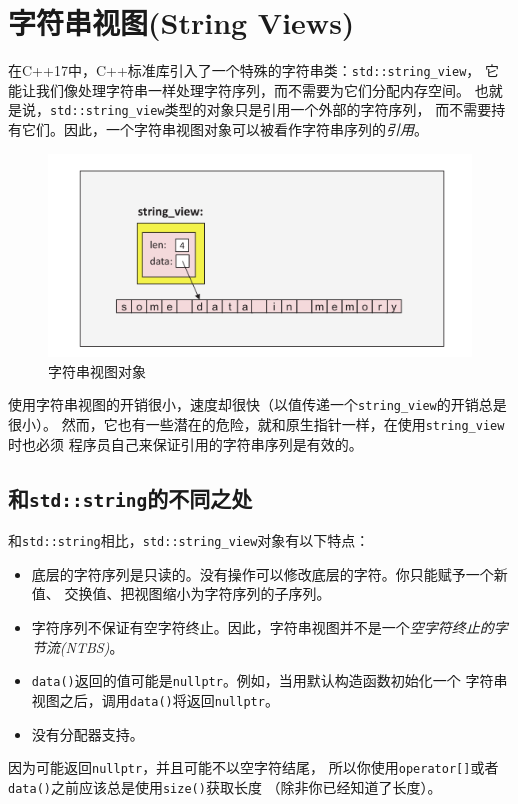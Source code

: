 \chapter[字符串视图]{字符串视图(String Views)}\label{ch19}
在C++17中，C++标准库引入了一个特殊的字符串类：\texttt{std::string\_view}，
它能让我们像处理字符串一样处理字符序列，而不需要为它们分配内存空间。
也就是说，\texttt{std::string\_view}类型的对象只是引用一个外部的字符序列，
而不需要持有它们。因此，一个字符串视图对象可以被看作字符串序列的\emph{引用}。

\begin{figure}[ht]
    \begin{center}
        \includegraphics[scale=0.8]{../imgs/19.1.png}
        \caption{字符串视图对象}
        \label{f19.1}
    \end{center}
\end{figure}

使用字符串视图的开销很小，速度却很快（以值传递一个\texttt{string\_view}的开销总是很小）。
然而，它也有一些潜在的危险，就和原生指针一样，在使用\texttt{string\_view}时也必须
程序员自己来保证引用的字符串序列是有效的。


\section{和\texttt{std::string}的不同之处}
和\texttt{std::string}相比，\texttt{std::string\_view}对象有以下特点：
\begin{itemize}
    \item 底层的字符序列是只读的。没有操作可以修改底层的字符。你只能赋予一个新值、
    交换值、把视图缩小为字符序列的子序列。
    \item 字符序列不保证有空字符终止。因此，字符串视图并不是一个\emph{空字符终止的字节流(NTBS)}。
    \item \texttt{data()}返回的值可能是\texttt{nullptr}。例如，当用默认构造函数初始化一个
    字符串视图之后，调用\texttt{data()}将返回\texttt{nullptr}。
    \item 没有分配器支持。
\end{itemize}
因为可能返回\texttt{nullptr}，并且可能不以空字符结尾，
所以你使用\texttt{operator[]}或者\texttt{data()}之前应该总是使用\texttt{size()}获取长度
（除非你已经知道了长度）。


